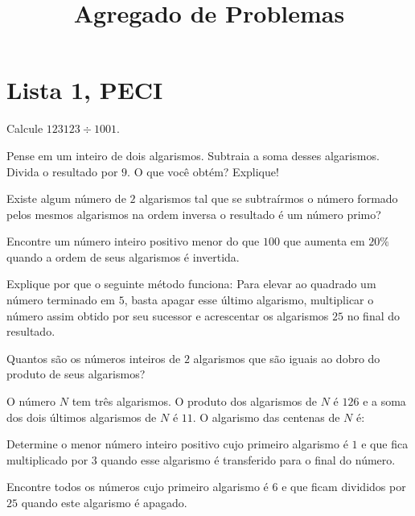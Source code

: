 \documentclass[10pt,a4paper]{article}
\title{Agregado de Problemas}
\author{\vspace{1.3ex}}
\begin{document}
	
	\zeustitle

	\section{Lista 1, PECI}

	\begin{prob}
		Calcule $123123 \div 1001$.
	\end{prob}
	
	\begin{prob}
		Pense em um inteiro de dois algarismos. Subtraia a soma desses algarismos. Divida o resultado por $9$. O que você obtém? Explique!
	\end{prob}
	
	\begin{prob}
		Existe algum número de $2$ algarismos tal que se subtraírmos o número formado pelos mesmos algarismos na ordem inversa o resultado é um número primo?
	\end{prob}
	
	\begin{prob}
		Encontre um número inteiro positivo menor do que $100$ que aumenta em $20\%$ quando a ordem de seus algarismos é invertida.
	\end{prob}
	
	\begin{prob}
		Explique por que o seguinte método funciona: Para elevar ao quadrado um número terminado em $5$, basta apagar esse último algarismo, multiplicar o número assim obtido por seu sucessor e acrescentar os algarismos $25$ no final do resultado.
	\end{prob}
	
	\begin{prob}
		Quantos são  os  números inteiros de $2$ algarismos que são iguais ao dobro do produto de seus algarismos?
	\end{prob}
	
	\begin{prob}
		O número $N$ tem três algarismos. O produto dos algarismos de $N$ é $126$ e a soma dos dois últimos algarismos de $N$ é $11$. O algarismo das centenas de $N$ é:
	\end{prob}
	
	\begin{prob}
		Determine o menor número inteiro positivo cujo primeiro algarismo é $1$ e que fica multiplicado por $3$ quando esse algarismo é transferido para o final do número.
	\end{prob}
	
	\begin{prob}
		Encontre todos os números cujo primeiro algarismo é $6$ e que ficam divididos por $25$ quando este algarismo é apagado.
	\end{prob}
	
\end{document}

